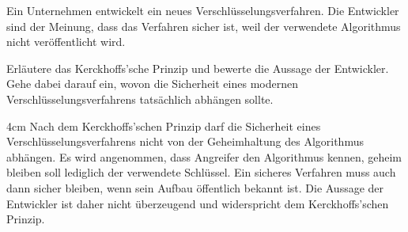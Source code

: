 \question[4]
Ein Unternehmen entwickelt ein neues Verschlüsselungsverfahren. Die Entwickler
sind der Meinung, dass das Verfahren sicher ist, weil der verwendete Algorithmus
nicht veröffentlicht wird.

Erläutere das Kerckhoffs’sche Prinzip und bewerte die Aussage der Entwickler.
Gehe dabei darauf ein, wovon die Sicherheit eines modernen
Verschlüsselungsverfahrens tatsächlich abhängen sollte.

\begin{solutionbox}{4cm}
Nach dem Kerckhoffs’schen Prinzip darf die Sicherheit eines
Verschlüsselungsverfahrens nicht von der Geheimhaltung des Algorithmus abhängen.
Es wird angenommen, dass Angreifer den Algorithmus kennen, 
geheim bleiben soll lediglich der verwendete Schlüssel.
Ein sicheres Verfahren muss auch dann sicher bleiben, wenn sein Aufbau 
öffentlich bekannt ist. Die Aussage der Entwickler ist daher nicht überzeugend
und widerspricht dem Kerckhoffs’schen Prinzip.
\end{solutionbox}